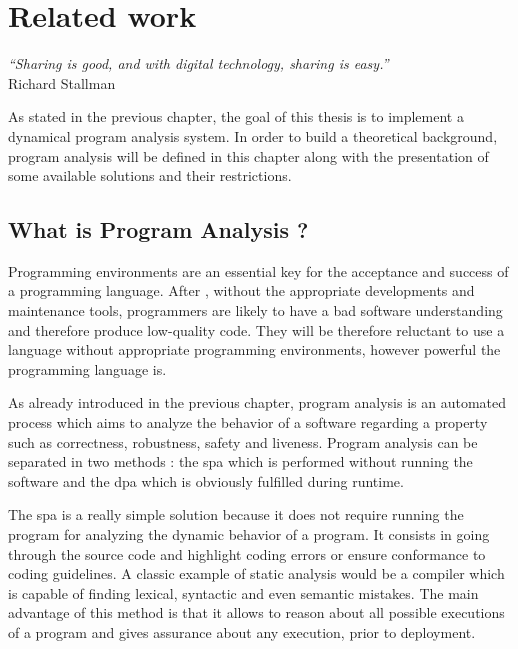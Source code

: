 

\chapter{Related work}
\label{chap:relatedwork}
\begin{flushright}
\textit{``Sharing is good, and with digital technology, sharing is easy.''} \\ Richard Stallman
\end{flushright}

As stated in the previous chapter, the goal of this thesis is to implement a dynamical program analysis system. In order to build a theoretical background, program analysis will be defined in this chapter along with the presentation of some available solutions and their restrictions.

\section{What is Program Analysis ?} 
Programming environments are an essential key for the acceptance and success of a programming language. After \cite{Ducasse1994}, without the appropriate developments and maintenance tools, programmers are likely to have a bad software understanding and therefore produce low-quality code. They will be therefore reluctant to use a language without appropriate programming environments, however powerful the programming language is.

As already introduced in the previous chapter, program analysis is an automated process which aims to analyze the behavior of a software regarding a property such as correctness, robustness, safety and liveness. Program analysis can be separated in two methods : the \gls{spa} which is performed without running the software and the \gls{dpa} which is obviously fulfilled during runtime. \citep{Wikipedi2016}

The \gls{spa} is a really simple solution because it does not require running the program for analyzing the dynamic behavior of a program. It consists in going through the source code and highlight coding errors or ensure conformance to coding guidelines. A classic example of static analysis would be a compiler which is capable of finding lexical, syntactic and even semantic mistakes. The main advantage of this method is that it allows to reason about all possible executions of a program and gives assurance about any execution, prior to deployment. 

